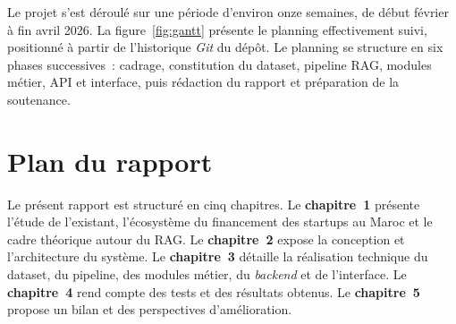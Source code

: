 Le projet s'est déroulé sur une période d'environ onze semaines, de début février à fin avril 2026. La figure~\ref{fig:gantt} présente le planning effectivement suivi, positionné à partir de l'historique \textit{Git} du dépôt. Le planning se structure en six phases successives~: cadrage, constitution du dataset, pipeline \ac{RAG}, modules métier, \ac{API} et interface, puis rédaction du rapport et préparation de la soutenance.



\section*{Plan du rapport}

Le présent rapport est structuré en cinq chapitres. Le \textbf{chapitre~1} présente l'étude de l'existant, l'écosystème du financement des startups au Maroc et le cadre théorique autour du \ac{RAG}. Le \textbf{chapitre~2} expose la conception et l'architecture du système. Le \textbf{chapitre~3} détaille la réalisation technique du dataset, du pipeline, des modules métier, du \textit{backend} et de l'interface. Le \textbf{chapitre~4} rend compte des tests et des résultats obtenus. Le \textbf{chapitre~5} propose un bilan et des perspectives d'amélioration.
